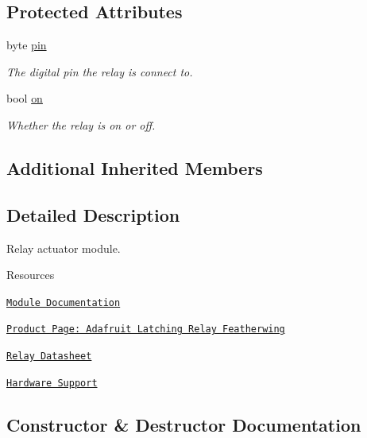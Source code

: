 \subsection*{Protected Attributes}
\begin{DoxyCompactItemize}
\item 
byte \hyperlink{class_loom___relay_ad3cc1e820888c8bbf632dc03036d6a84}{pin}
\begin{DoxyCompactList}\small\item\em The digital pin the relay is connect to. \end{DoxyCompactList}\item 
bool \hyperlink{class_loom___relay_aaad7e04f955ebe499b45e5af5a4ed7d6}{on}
\begin{DoxyCompactList}\small\item\em Whether the relay is on or off. \end{DoxyCompactList}\end{DoxyCompactItemize}
\subsection*{Additional Inherited Members}


\subsection{Detailed Description}
Relay actuator module. 

\begin{DoxyParagraph}{Resources}

\begin{DoxyItemize}
\item \href{https://openslab-osu.github.io/Loom/html/class_loom___relay.html}{\tt Module Documentation}
\item \href{https://www.adafruit.com/product/3191}{\tt Product Page\+: Adafruit Latching Relay Featherwing}
\item \href{https://cdn-shop.adafruit.com/product-files/3191/G5LE-14-DC3-Omron-datasheet-10841140.pdf}{\tt Relay Datasheet}
\item \href{https://github.com/OPEnSLab-OSU/Loom/wiki/Hardware-Support#relay}{\tt Hardware Support} 
\end{DoxyItemize}
\end{DoxyParagraph}


\subsection{Constructor \& Destructor Documentation}

